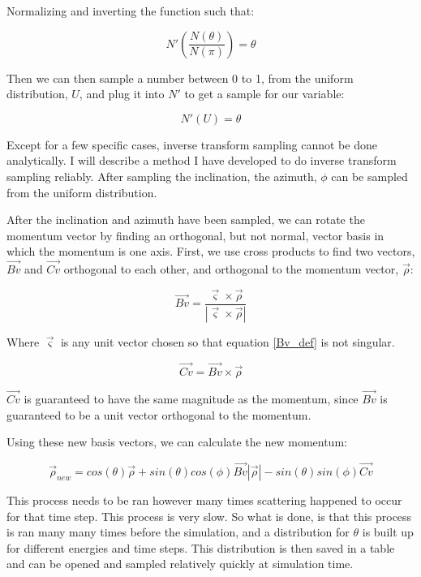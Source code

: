 \documentclass[]{article}
\begin{document}
Normalizing and inverting the function such that:

\begin{equation}
N'\left(  \frac{N(\theta)}{N(\pi)}  \right) = \theta
\end{equation}

Then we can then sample a number between 0 to 1, from the uniform distribution, $U$, and plug it into $N'$ to get a sample for our variable:

\begin{equation}
N'\left(  U  \right) = \theta
\end{equation}

Except for a few specific cases, inverse transform sampling cannot be done analytically. I will describe a method I have developed to do inverse transform sampling reliably. After sampling the inclination, the azimuth, $\phi$ can be sampled from the uniform distribution. 

After the inclination and azimuth have been sampled, we can rotate the momentum vector by finding an orthogonal, but not normal, vector basis in which the momentum is one axis. First, we use cross products to find two vectors, $\vec{Bv}$ and $\vec{Cv}$ orthogonal to each other, and orthogonal to the momentum vector, $\vec{\rho}$:

\begin{equation}
\label{Bv_def}
\vec{Bv}=\frac{\vec{\varsigma}\times \vec{\rho}}{ \left| \vec{\varsigma}\times \vec{\rho}  \right|   }
\end{equation}

Where $\vec{\varsigma}$ is any unit vector chosen so that equation \ref{Bv_def} is not singular.

\begin{equation}
\vec{Cv}=\vec{Bv}\times \vec{\rho}
\end{equation}

$\vec{Cv}$ is guaranteed to have the same magnitude as the momentum, since $\vec{Bv}$ is guaranteed to be a unit vector orthogonal to the momentum.

Using these new basis vectors, we can calculate the new momentum:

\begin{equation}
\vec{\rho}_{new}= cos(\theta) \vec{\rho} + sin(\theta) cos(\phi) \vec{Bv} \left|\vec{\rho} \right| - sin(\theta) sin(\phi) \vec{Cv} 
\end{equation}

This process needs to be ran however many times scattering happened to occur for that time step. This process is very slow. So what is done, is that this process is ran many many times before the simulation, and a distribution for $\theta$ is built up for different energies and time steps. This distribution is then saved in a table and can be opened and sampled relatively quickly at simulation time.
\end{document}
